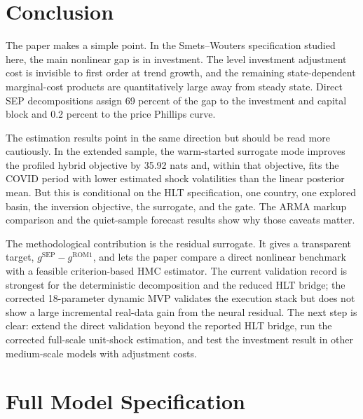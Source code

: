 \documentclass[12pt]{article}
\newif\ifpaperappendix
\theoremstyle{plain}
\theoremstyle{definition}
\theoremstyle{remark}
\begin{document}
\section{Conclusion}
\label{sec:conclusion}

The paper makes a simple point. In the Smets--Wouters specification studied
here, the main nonlinear gap is in investment. The level investment adjustment
cost is invisible to first order at trend growth, and the remaining
state-dependent marginal-cost products are quantitatively large away from
steady state. Direct SEP decompositions assign 69 percent of the gap to the
investment and capital block and 0.2 percent to the price Phillips curve.

The estimation results point in the same direction but should be read more
cautiously. In the extended sample, the warm-started surrogate mode improves
the profiled hybrid objective by 35.92 nats and, within that objective, fits
the COVID period with lower estimated shock volatilities than the linear
posterior mean. But this is conditional on the HLT specification, one country,
one explored basin, the inversion objective, the surrogate, and the gate. The
ARMA markup comparison and the quiet-sample forecast results show why those
caveats matter.

The methodological contribution is the residual surrogate. It gives a
transparent target, \(g^{\mathrm{SEP}}-g^{\mathrm{ROM1}}\), and lets the paper
compare a direct nonlinear benchmark with a feasible criterion-based HMC
estimator. The current validation record is strongest for the deterministic
decomposition and the reduced HLT bridge; the corrected 18-parameter dynamic
MVP validates the execution stack but does not show a large incremental
real-data gain from the neural residual. The next step is clear: extend the
direct validation beyond the reported HLT bridge, run the corrected full-scale
unit-shock estimation, and test the investment result in other medium-scale
models with adjustment costs.


\pagebreak



\ifpaperappendix
\pagebreak

\appendix

\section{Full Model Specification}
\label{app:model}
\end{document}

